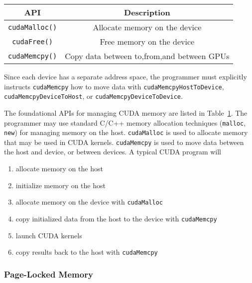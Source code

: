 \begin{table}[h]
    \centering
    \caption[BCUDA Basic Memory-management APIs]{}
    \label{tab:cuda-basic-apis}
    \begin{tabular}{|c|c|}
    \hline
    \textbf{API}    & \textbf{Description}                             \\ \hline
    \texttt{cudaMalloc()} & Allocate memory on the device              \\ \hline
    \texttt{cudaFree()}   & Free memory on the device                  \\ \hline
    \texttt{cudaMemcpy()} & Copy data between to,from,and between GPUs \\ \hline
    \end{tabular}
\end{table}

Since each device has a separate address space, the programmer must explicitly instructs \texttt{cudaMemcpy} how to move data with \texttt{cudaMemcpyHostToDevice}, \texttt{cudaMemcpyDeviceToHost}, or \texttt{cudaMemcpyDeviceToDevice}.

The foundational APIs for managing CUDA memory are listed in Table~\ref{tab:cuda-basic-apis}.
The programmer may use standard C/C++ memory allocation techniques (\texttt{malloc}, \texttt{new}) for managing memory on the host.
\texttt{cudaMalloc} is used to allocate memory that may be used in CUDA kernels.
\texttt{cudaMemcpy} is used to move data between the host and device, or between devices.
A typical CUDA program will
\begin{enumerate}
    \item allocate memory on the host
    \item initialize memory on the host
    \item allocate memory on the device with \texttt{cudaMalloc}
    \item copy initialized data from the host to the device with \texttt{cudaMemcpy}
    \item launch CUDA kernels
    \item copy results back to the host with \texttt{cudaMemcpy}
\end{enumerate}


\subsubsection{Page-Locked Memory}

